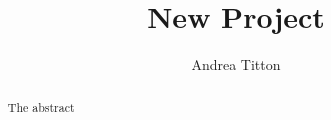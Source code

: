\documentclass[abstract=on]{scrartcl}
\author{Andrea Titton}
\title{New Project}
\theoremstyle{plain}
\begin{document}
\maketitle

\begin{abstract}
  The abstract
\end{abstract}

\newpage
% 



\newpage
\printbibliography
{} %
\newpage
\appendix
% 
\end{document}
